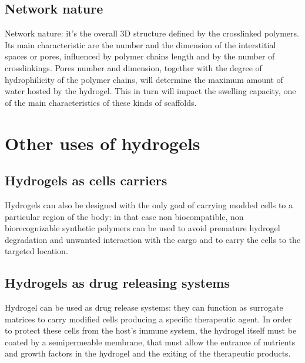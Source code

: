 	\subsection{Network nature}
	Network nature: it’s the overall 3D structure defined by the crosslinked polymers.
	Its main characteristic are the number and the dimension of the interstitial spaces or pores, influenced by polymer chains length and by the number of crosslinkings.
	Pores number and dimension, together with the degree of hydrophilicity of the polymer chains, will determine the maximum amount of water hosted by the hydrogel.
	This in turn will impact the swelling capacity, one of the main characteristics of these kinds of scaffolds.

\section{Other uses of hydrogels}

	\subsection{Hydrogels as cells carriers}
	Hydrogels can also be designed with the only goal of carrying modded cells to a particular region of the body: in that case non biocompatible, non biorecognizable synthetic polymers can be used to avoid premature hydrogel degradation and unwanted interaction with the cargo and to carry the cells to the targeted location.

	\subsection{Hydrogels as drug releasing systems}
	Hydrogel can be used as drug release systems: they can function as surrogate matrices to carry modified cells producing a specific therapeutic agent.
	In order to protect these cells from the host’s immune system, the hydrogel itself must be coated by a semipermeable membrane, that must allow the entrance of nutrients and growth factors in the hydrogel and the exiting of the therapeutic products.
